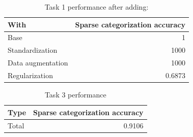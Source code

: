 
\begin{table}[h]
    \centering
    \begin{tabular}{lr}
        \toprule
        With & Sparse categorization accuracy \\
        \midrule
        Base & 1 \\
        Standardization & 1000 \\
        Data augmentation & 1000 \\
        Regularization & 0.6873 \\
        \bottomrule
    \end{tabular}
    \caption{Task 1 performance after adding:}
    \label{tab:table1}
\end{table}

\begin{table}[h]
    \centering
    \begin{tabular}{lr}
        \toprule
        Type & Sparse categorization accuracy \\
        \midrule
        Total & 0.9106 \\
        \bottomrule
    \end{tabular}
    \caption{Task 3 performance}
    \label{tab:table2}
\end{table}


